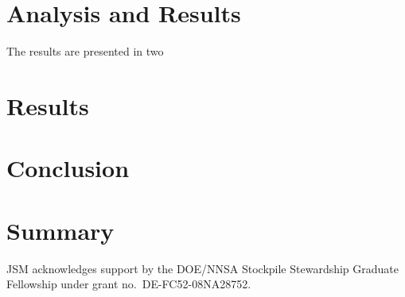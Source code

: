 \documentclass[aps,prc,reprint,amsmath,nofootinbib,superscriptaddress]{revtex4-1}
\begin{document}
\section{Analysis and Results}

The results are presented in two


\section{Results}


\section{Conclusion}

\section{Summary}

\begin{acknowledgments}
 JSM acknowledges support by the DOE/NNSA Stockpile Stewardship Graduate Fellowship under grant no.~DE-FC52-08NA28752.
\end{acknowledgments}


\end{document}
